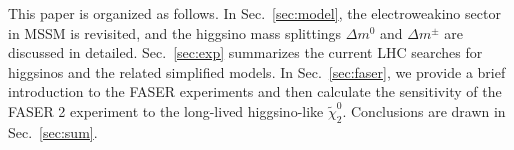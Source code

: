 \documentclass[letterpaper,11pt]{article}
\begin{document}
\par This paper is organized as follows. 
In Sec.~\ref{sec:model}, the electroweakino sector in MSSM is revisited, and the higgsino mass splittings $\Delta m^0$ and $\Delta m^\pm$ are discussed in detailed. 
Sec.~\ref{sec:exp} summarizes the current LHC searches for higgsinos and the related simplified models. 
In Sec.~\ref{sec:faser}, we provide a brief introduction to the FASER experiments and then calculate the sensitivity of the FASER 2 experiment to the long-lived higgsino-like $\tilde{\chi}_2^0$.  
Conclusions are drawn in Sec.~\ref{sec:sum}.



\end{document}
